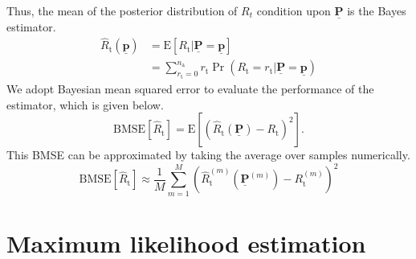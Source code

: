 Thus, the mean of the posterior distribution of $R_{t}$ condition upon $\underline{\mathbf{P}}$ is the Bayes estimator.
\begin{equation} \label{equation:MMSE}
\begin{split}
\hat{R}_{\mathrm{t}} \left( \underline{\mathbf{p}} \right)
&= \mathrm{E} \left[ R_{\mathrm{t}}
| \underline{\mathbf{P}} = \underline{\mathbf{p}} \right] \\
&= \sum_{r_{\mathrm{t}} = 0}^{n_{\mathrm{a}}} r_{\mathrm{t}}
\Pr \left( R_{\mathrm{t}} = r_{\mathrm{t}}
| \underline{\mathbf{P}} = \underline{\mathbf{p}} \right) 
\end{split}
\end{equation}
We adopt Bayesian mean squared error to evaluate the performance of the estimator, which is given below.
\begin{equation} \label{equation:BMSE}
\mathrm{BMSE} \left[ \hat{R}_{\mathrm{t}} \right]
= \mathrm{E} \left[ \left(
\hat{R}_{\mathrm{t}} \left( \underline{\mathbf{P}} \right)
- R_{\mathrm{t}} \right)^2 \right] .
\end{equation}
This BMSE can be approximated by taking the average over samples numerically.
\begin{equation} \label{equation:EmpiricalBMSE}
\mathrm{BMSE} \left[ \hat{R}_{\mathrm{t}} \right]
\approx \frac{1}{M} \sum_{m=1}^M \left(
\hat{R}_{\mathrm{t}}^{(m)} \left( \underline{\mathbf{P}}^{(m)} \right)
- R_{\mathrm{t}}^{(m)} \right)^2 
\end{equation}
\section{Maximum likelihood estimation} \label{section:Maxestimation}

